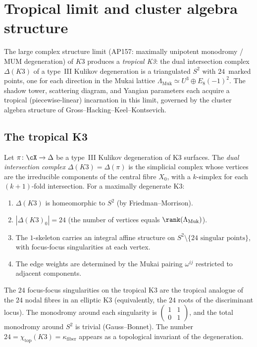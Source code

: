 \section{Tropical limit and cluster algebra structure}
\label{sec:k3e-tropical}

The large complex structure limit (AP157: maximally unipotent monodromy / MUM degeneration) of $K3$ produces a \emph{tropical K3}: the dual intersection complex $\Delta(K3)$ of a type~III Kulikov degeneration is a triangulated $S^2$ with $24$~marked points, one for each direction in the Mukai lattice $\Lambda_{\mathrm{Muk}} \simeq U^3 \oplus E_8(-1)^2$.  The shadow tower, scattering diagram, and Yangian parameters each acquire a tropical (piecewise-linear) incarnation in this limit, governed by the cluster algebra structure of Gross--Hacking--Keel--Kontsevich.

\subsection{The tropical K3}
\label{subsec:tropical-k3}

\begin{definition}
\label{def:tropical-k3}
Let $\pi \colon \cX \to \Delta$ be a type~III Kulikov degeneration of K3 surfaces.  The \emph{dual intersection complex} $\Delta(K3) = \Delta(\pi)$ is the simplicial complex whose vertices are the irreducible components of the central fibre $X_0$, with a $k$-simplex for each $(k+1)$-fold intersection.  For a maximally degenerate K3:
\begin{enumerate}[label=\textup{(\roman*)}]
\item $\Delta(K3)$ is homeomorphic to $S^2$ (by Friedman--Morrison).
\item $|\Delta(K3)_0| = 24$ (the number of vertices equals $\rank(\Lambda_{\mathrm{Muk}})$).
\item The $1$-skeleton carries an integral affine structure on $S^2 \setminus \{24\text{ singular points}\}$, with focus-focus singularities at each vertex.
\item The edge weights are determined by the Mukai pairing $\omega^{ij}$ restricted to adjacent components.
\end{enumerate}
\end{definition}

\begin{remark}
\label{rem:tropical-k3-24}
The $24$ focus-focus singularities on the tropical K3 are the tropical analogue of the $24$ nodal fibres in an elliptic K3 (equivalently, the $24$ roots of the discriminant locus).  The monodromy around each singularity is $\left(\begin{smallmatrix} 1 & 1 \\ 0 & 1 \end{smallmatrix}\right)$, and the total monodromy around $S^2$ is trivial (Gauss--Bonnet).  The number $24 = \chi_{\mathrm{top}}(K3) = \kappa_{\mathrm{fiber}}$ appears as a topological invariant of the degeneration.
\end{remark}

